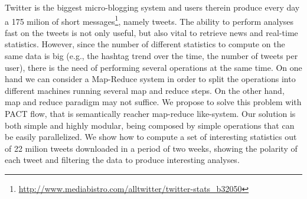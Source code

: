 Twitter is the biggest micro-blogging system and users therein produce every day a 175 milion of short messages\footnote{\url{http://www.mediabistro.com/alltwitter/twitter-stats_b32050}}, namely tweets.
The ability to perform analyses fast on the tweets is not only useful, but also vital to retrieve news and real-time statistics. 
However, since the number of different statistics to compute on the same data is big (e.g., the hashtag trend over the time, the number of tweets per user), there is the need of performing several operations at the same time. 
On one hand we can consider a Map-Reduce system in order to split the operations into different machines running several map and reduce steps.
On the other hand, map and reduce paradigm may not suffice. 
We propose to solve this problem with PACT flow, that is semantically reacher map-reduce like-system.
Our solution is both simple and highly modular, being composed by simple operations that can be easily parallelized. 
We show how to compute a set of interesting statistics out of 22 milion tweets downloaded in a period of two weeks, showing the polarity of each tweet and filtering the data to produce interesting analyses. 

